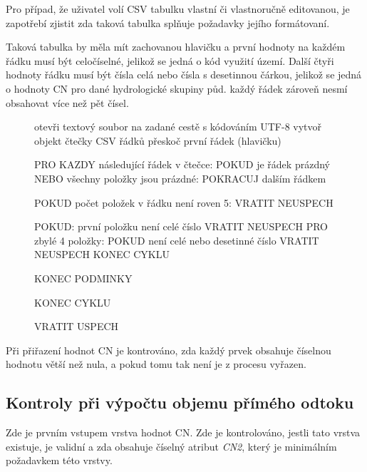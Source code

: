\documentclass[a4paper,oneside,12pt]{book}
\begin{document}
\hspace{10mm} Pro případ, že uživatel volí CSV tabulku vlastní či vlastnoručně editovanou, je zapotřebí zjistit zda taková tabulka splňuje požadavky jejího formátovaní. 

\hspace{10mm} Taková tabulka by měla mít zachovanou hlavičku a první hodnoty na každém řádku musí být celočíselné, jelikož se jedná o kód využití území. Další čtyři hodnoty řádku musí být čísla celá nebo čísla s desetinnou čárkou, jelikož se jedná o hodnoty CN pro dané hydrologické skupiny půd. každý řádek zároveň nesmí obsahovat více než pět čísel.


\begin{figure}[H]
\begin{pseudocode}[style=mypseudocode, caption={Ukázka kontroly CSV souboru},label={kod:csv_check}]
otevři textový soubor na zadané cestě s kódováním UTF-8
vytvoř objekt čtečky CSV řádků
přeskoč první řádek (hlavičku)

PRO KAZDY následující řádek v čtečce:
    POKUD je řádek prázdný NEBO všechny položky jsou prázdné:
        POKRACUJ dalším řádkem
    
    POKUD počet položek v řádku není roven 5:
        VRATIT NEUSPECH
    

    POKUD:
        první položku není celé číslo
        VRATIT NEUSPECH
        PRO zbylé 4 položky:
            POKUD není celé nebo desetinné číslo
            VRATIT NEUSPECH
            KONEC CYKLU

    KONEC PODMINKY
    
KONEC CYKLU

VRATIT USPECH
\end{pseudocode}
\end{figure}

\hspace{10mm} Při přiřazení hodnot CN je kontrováno, zda každý prvek obsahuje číselnou hodnotu větší než nula, a pokud tomu tak není je z procesu vyřazen.

\subsection{Kontroly při výpočtu objemu přímého odtoku} 
\label{runoff_checks}
\hspace{10mm} Zde je prvním vstupem vrstva hodnot CN. Zde je kontrolováno, jestli tato vrstva existuje, je validní a zda obsahuje číselný atribut \textit{CN2}, který je minimálním požadavkem této vrstvy.
\end{document}
